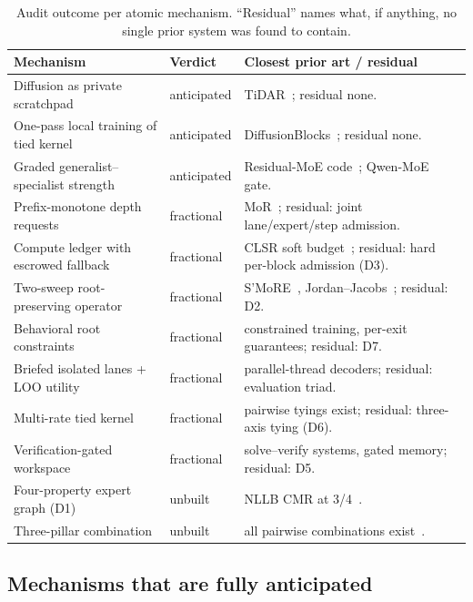 \documentclass[10pt,a4paper]{article}
\begin{document}
\begin{table}[htbp]
\caption{Audit outcome per atomic mechanism. ``Residual'' names what, if
anything, no single prior system was found to contain.}
\label{tab:audit}
\centering\small
\begin{tabularx}{\textwidth}{@{}llX@{}}
\toprule
\textbf{Mechanism} & \textbf{Verdict} & \textbf{Closest prior art / residual} \\
\midrule
Diffusion as private scratchpad & anticipated & TiDAR~\cite{tidar2025}; residual none. \\
One-pass local training of tied kernel & anticipated & DiffusionBlocks~\cite{shing2025}; residual none. \\
Graded generalist--specialist strength & anticipated & Residual-MoE code~\cite{rajbhandari2022}; Qwen-MoE gate. \\
Prefix-monotone depth requests & fractional & MoR~\cite{mor2025}; residual: joint lane/expert/step admission. \\
Compute ledger with escrowed fallback & fractional & CLSR soft budget~\cite{zhang2021clsr}; residual: hard per-block admission (D3). \\
Two-sweep root-preserving operator & fractional & S'MoRE~\cite{smore2025}, Jordan--Jacobs~\cite{jordan1994}; residual: D2. \\
Behavioral root constraints & fractional & constrained training, per-exit guarantees; residual: D7. \\
Briefed isolated lanes + LOO utility & fractional & parallel-thread decoders; residual: evaluation triad. \\
Multi-rate tied kernel & fractional & pairwise tyings exist; residual: three-axis tying (D6). \\
Verification-gated workspace & fractional & solve--verify systems, gated memory; residual: D5. \\
\midrule
Four-property expert graph (D1) & unbuilt & NLLB CMR at 3/4~\cite{nllb2022}. \\
Three-pillar combination & unbuilt & all pairwise combinations exist~\cite{mot2025,tidar2025}. \\
\bottomrule
\end{tabularx}
\end{table}

\subsection{Mechanisms that are fully anticipated}
\end{document}
